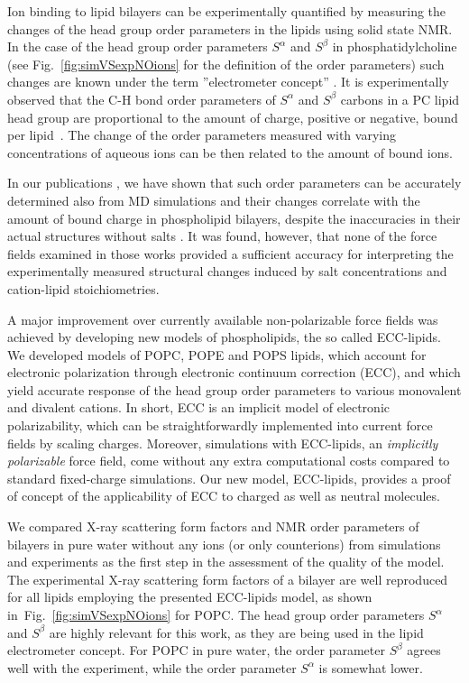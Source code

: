 \documentclass[12pt,a4paper,twoside,openright]{report}
\begin{document}
Ion binding to lipid bilayers can be experimentally quantified
by measuring the changes of the head group order parameters in the lipids using solid state NMR.
In the case of the head group order parameters $S^\alpha$ and $S^\beta$ in phosphatidylcholine
(see Fig.~\ref{fig:simVSexpNOions} for the definition of the order parameters)
such changes are known under the term ''electrometer concept'' \citep{seelig87,catte16, ollila16}. 
It is experimentally observed that the C-H bond
order parameters of $S^\alpha$ and $S^\beta$ carbons in a PC lipid head group
are proportional to the amount of charge, positive or negative, bound per lipid~\citep{seelig87}.
The change of the order parameters measured with varying concentrations of aqueous ions 
can be then related to the amount of bound ions.


In our publications \citep{catte16, nmrlipids_proj4},
we have shown that such order parameters can be accurately determined also from MD simulations
and their changes correlate with the amount of bound charge in phospholipid bilayers, 
despite the inaccuracies in their actual structures without salts \citep{botan15}. 
It was found, however, that
none of the force fields examined in those works 
provided a sufficient accuracy for interpreting 
the experimentally measured structural changes induced by salt concentrations
and cation-lipid stoichiometries. 


A major improvement over currently available non-polarizable force fields
was achieved by developing new models of phospholipids, 
the so called ECC-lipids.
We developed models of POPC, POPE and POPS lipids,
which account for electronic polarization through electronic continuum correction (ECC), 
and which yield accurate response of the head group order parameters to various monovalent and divalent cations. \citep{melcr18}
In short, 
ECC is an implicit model of electronic polarizability,
which can be straightforwardly implemented into current force fields 
by scaling charges. 
Moreover, simulations with ECC-lipids, an \emph{implicitly polarizable} force field, come 
without any extra computational costs compared to standard fixed-charge simulations. 
Our new model, ECC-lipids,
provides a proof of concept of the applicability of ECC
to charged as well as neutral molecules. 

We compared X-ray scattering form factors and NMR order parameters of bilayers
in pure water without any ions (or only counterions)
from simulations and experiments
as the first step in the assessment of the quality of the model. 
The experimental X-ray scattering form factors 
of a bilayer are well reproduced for all lipids employing the presented ECC-lipids model, 
as shown in~Fig.~\ref{fig:simVSexpNOions} for POPC. 
The head group order parameters $S^\alpha$ and $S^\beta$ are highly relevant for this work,
as they are being used in the lipid electrometer concept. 
For POPC in pure water, the order parameter $S^\beta$ agrees well with the experiment, 
while the order parameter $S^\alpha$ is somewhat lower. 
\end{document}
